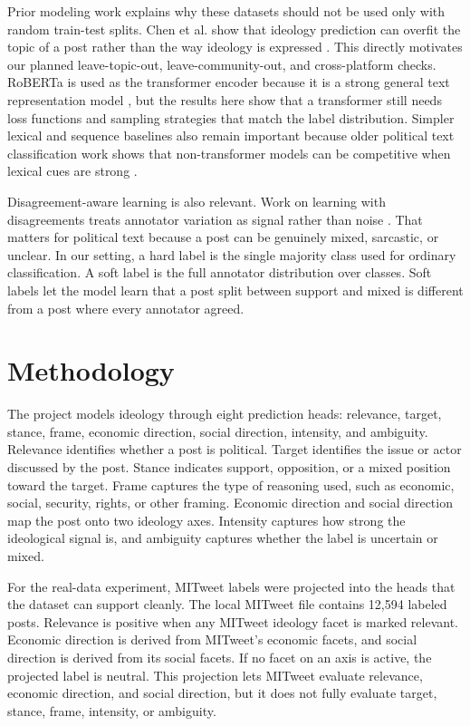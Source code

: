 \documentclass[11pt,twocolumn]{article}
\begin{document}
Prior modeling work explains why these datasets should not be used only with random train-test splits. Chen et al. show that ideology prediction can overfit the topic of a post rather than the way ideology is expressed \cite{chen-etal-2023-ideology}. This directly motivates our planned leave-topic-out, leave-community-out, and cross-platform checks. RoBERTa is used as the transformer encoder because it is a strong general text representation model \cite{liu2019roberta}, but the results here show that a transformer still needs loss functions and sampling strategies that match the label distribution. Simpler lexical and sequence baselines also remain important because older political text classification work shows that non-transformer models can be competitive when lexical cues are strong \cite{chang-masterson-2020-wordorder}.

Disagreement-aware learning is also relevant. Work on learning with disagreements treats annotator variation as signal rather than noise \cite{leonardelli-etal-2025-lewidi}. That matters for political text because a post can be genuinely mixed, sarcastic, or unclear. In our setting, a hard label is the single majority class used for ordinary classification. A soft label is the full annotator distribution over classes. Soft labels let the model learn that a post split between support and mixed is different from a post where every annotator agreed.

\section{Methodology}

The project models ideology through eight prediction heads: relevance, target, stance, frame, economic direction, social direction, intensity, and ambiguity. Relevance identifies whether a post is political. Target identifies the issue or actor discussed by the post. Stance indicates support, opposition, or a mixed position toward the target. Frame captures the type of reasoning used, such as economic, social, security, rights, or other framing. Economic direction and social direction map the post onto two ideology axes. Intensity captures how strong the ideological signal is, and ambiguity captures whether the label is uncertain or mixed.

For the real-data experiment, MITweet labels were projected into the heads that the dataset can support cleanly. The local MITweet file contains 12,594 labeled posts. Relevance is positive when any MITweet ideology facet is marked relevant. Economic direction is derived from MITweet's economic facets, and social direction is derived from its social facets. If no facet on an axis is active, the projected label is neutral. This projection lets MITweet evaluate relevance, economic direction, and social direction, but it does not fully evaluate target, stance, frame, intensity, or ambiguity.
\end{document}
